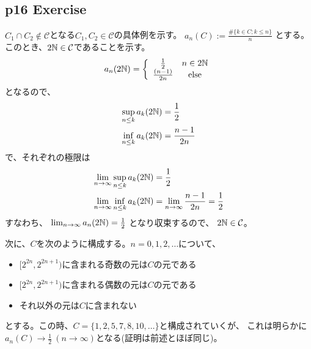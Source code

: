 
\subsection{p16 Exercise}
    $C_1\cap C_2\not\in\mathcal{C}$となる$C_1, C_2\in\mathcal{C}$の具体例を示す。
    $a_n(C) := \frac{\#\{k\in C; k\leq n\}}{n}$
    とする。このとき、$2{\mathbb{N}}\in\mathcal{C}$であることを示す。
    \begin{align*}
        a_n(2{\mathbb{N}}) = \left \{
        \begin{array}{cc}
            \frac{1}{2} & n\in 2{\mathbb{N}}\\
            \frac{(n-1)}{2 n} & \mathrm{else}
        \end{array}
        \right.
    \end{align*}
    となるので、
    \begin{align*}
        \sup_{n\leq k} a_k(2{\mathbb{N}}) &= \frac{1}{2} \\
        \inf_{n\leq k} a_k(2{\mathbb{N}}) &= \frac{n-1}{2n}
    \end{align*}
    で、それぞれの極限は
    \begin{align*}
        \lim_{n\to\infty}\sup_{n\leq k} a_k(2{\mathbb{N}}) &= \frac{1}{2} \\
        \lim_{n\to\infty}\inf_{n\leq k} a_k(2{\mathbb{N}}) &= \lim_{n\to\infty}\frac{n-1}{2n} = \frac{1}{2}
    \end{align*}
    すなわち、
    $\lim_{n\to\infty} a_n(2{\mathbb{N}}) = \frac{1}{2}$
    となり収束するので、
    $2{\mathbb{N}}\in\mathcal{C}$。

    次に、$C$を次のように構成する。$n = 0,1,2,\ldots$について、
    \begin{itemize}
        \item $[2^{2n}, 2^{2n + 1})$に含まれる奇数の元は$C$の元である
        \item $[2^{2n}, 2^{2n + 1})$に含まれる偶数の元は$C$の元である
        \item それ以外の元は$C$に含まれない
    \end{itemize}
    とする。この時、$C = \{1,2,5,7,8,10,\ldots\}$と構成されていくが、
    これは明らかに$a_n(C)\to\frac{1}{2}\ (n\to\infty)$となる(証明は前述とほぼ同じ)。
        
